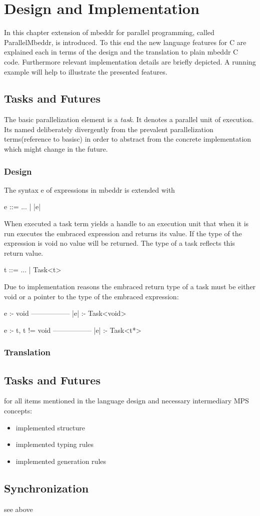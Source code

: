\chapter{Design and Implementation}
In this chapter extension of mbeddr for parallel programming, called ParallelMbeddr, is introduced. To this end the new language features for C are explained each in terms of the design and the translation to plain mbeddr C code. Furthermore relevant implementation details are briefly depicted. A running example will help to illustrate the presented features.


\section{Tasks and Futures}
The basic parallelization element is a \textit{task}. It denotes a parallel unit of execution. Its named deliberately divergently from the prevalent parallelization terms(reference to basisc) in order to abstract from the concrete implementation which might change in the future.
\subsection{Design}
The syntax e of expressions in mbeddr is extended with

e ::= ... | |e|

When executed a task term yields a handle to an execution unit that when it is run executes the embraced expression and returns its value. If the type of the expression is void no value will be returned. The type of a task reflects this return value.

t ::= ... | Task<t>

Due to implementation reasons the embraced return type of a task must be either void or a pointer to the type of the embraced expression:

e :- void
-----------------
|e| :- Task<void>

e :- t, t != void
-----------------
|e| :- Task<t*>


\subsection{Translation}














\section{Tasks and Futures}
for all items mentioned in the language design and necessary intermediary MPS concepts:
\begin{itemize}
\item implemented structure
\item implemented typing rules
\item implemented generation rules
\end{itemize}
\section{Synchronization}
see above

